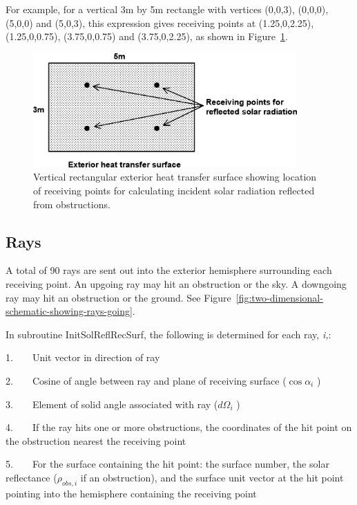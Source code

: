 For example, for a vertical 3m by 5m rectangle with vertices (0,0,3), (0,0,0), (5,0,0) and (5,0,3), this expression gives receiving points at (1.25,0,2.25), (1.25,0,0.75), (3.75,0,0.75) and (3.75,0,2.25), as shown in Figure~\ref{fig:vertical-rectangular-exterior-heat-transfer}.

\begin{figure}[hbtp] %
\centering
\includegraphics[width=0.9\textwidth, height=0.9\textheight, keepaspectratio=true]{media/image676.png}
\caption{Vertical rectangular exterior heat transfer surface showing location of receiving points for calculating incident solar radiation reflected from obstructions. \protect \label{fig:vertical-rectangular-exterior-heat-transfer}}
\end{figure}

\subsection{Rays}\label{rays}

A total of 90 rays are sent out into the exterior hemisphere surrounding each receiving point. An upgoing ray may hit an obstruction or the sky. A downgoing ray may hit an obstruction or the ground. See Figure~\ref{fig:two-dimensional-schematic-showing-rays-going}.

In subroutine InitSolReflRecSurf, the following is determined for each ray, \emph{i,}:

1.~~~~Unit vector in direction of ray

2.~~~~Cosine of angle between ray and plane of receiving surface (\(\cos {\alpha_i}\) )

3.~~~~Element of solid angle associated with ray (\(d{\Omega_i}\) )

4.~~~~If the ray hits one or more obstructions, the coordinates of the hit point on the obstruction nearest the receiving point

5.~~~~For the surface containing the hit point: the surface number, the solar reflectance (\({\rho_{obs,i}}\) if an obstruction), and the surface unit vector at the hit point pointing into the hemisphere containing the receiving point

